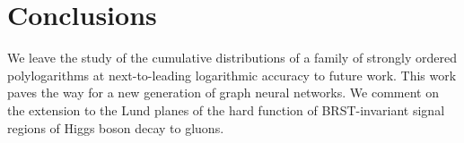 \section{Conclusions}\label{sec:conclusions}

We leave the study of the cumulative distributions of a family of
strongly ordered polylogarithms at next-to-leading logarithmic accuracy
to future work. This work paves the way for a new generation of graph
neural networks. We comment on the extension to the Lund planes of the
hard function of BRST-invariant signal regions of Higgs boson decay to
gluons.

